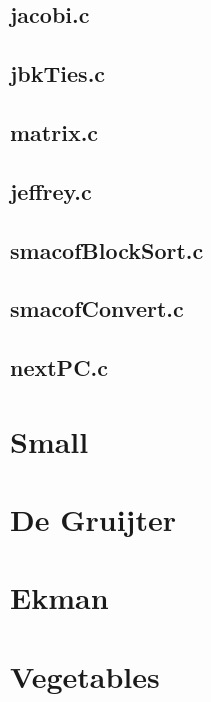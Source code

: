 \documentclass[
  12pt,
]{book}
\begin{document}
\subsection{jacobi.c}\label{jacobi.c}

\subsection{jbkTies.c}\label{jbkties.c}

\subsection{matrix.c}\label{matrix.c}

\subsection{jeffrey.c}\label{jeffrey.c}

\subsection{smacofBlockSort.c}\label{smacofblocksort.c}

\subsection{smacofConvert.c}\label{smacofconvert.c}

\subsection{nextPC.c}\label{nextpc.c}

\section{Small}\label{apdatadsmall}

\section{De Gruijter}\label{apdatagruijter}

\section{Ekman}\label{apdataekman}

\section{Vegetables}\label{apdataveg}
\end{document}

